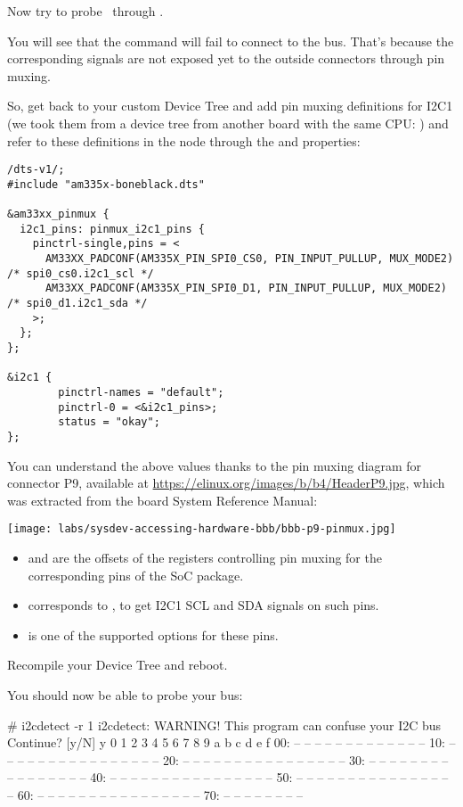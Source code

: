 {Now try to probe \busname\  through .

You will see that the command will fail to connect to
the bus. That's because the corresponding signals are
not exposed yet to the outside connectors through pin muxing.

So, get back to your custom Device Tree and add pin muxing definitions
for I2C1 (we took them from a device tree from another board with the same
CPU: ) and refer to these
definitions in the  node through the 
and  properties:

\begin{verbatim}
/dts-v1/;
#include "am335x-boneblack.dts"

&am33xx_pinmux {
  i2c1_pins: pinmux_i2c1_pins {
    pinctrl-single,pins = <
      AM33XX_PADCONF(AM335X_PIN_SPI0_CS0, PIN_INPUT_PULLUP, MUX_MODE2) /* spi0_cs0.i2c1_scl */
      AM33XX_PADCONF(AM335X_PIN_SPI0_D1, PIN_INPUT_PULLUP, MUX_MODE2) /* spi0_d1.i2c1_sda */
    >;
  };
};

&i2c1 {
        pinctrl-names = "default";
        pinctrl-0 = <&i2c1_pins>;
        status = "okay";
};
\end{verbatim}

You can understand the above values thanks to the pin muxing diagram for
connector P9, available at \url{https://elinux.org/images/b/b4/HeaderP9.jpg},
which was extracted from the board System Reference Manual:

\texttt{[image: labs/sysdev-accessing-hardware-bbb/bbb-p9-pinmux.jpg]}

\begin{itemize}
  \item {} and  are
        the offsets of the registers controlling pin muxing for the
	corresponding pins of the SoC package.
  \item {} corresponds to , to get I2C1 SCL and SDA
	signals on such pins.
  \item {} is one of the supported options for
        these pins.
\end{itemize}

Recompile your Device Tree and reboot.

You should now be able to probe your bus:

\begin{bashinput}
# i2cdetect -r 1
i2cdetect: WARNING! This program can confuse your I2C bus
Continue? [y/N] y
     0  1  2  3  4  5  6  7  8  9  a  b  c  d  e  f
00:          -- -- -- -- -- -- -- -- -- -- -- -- --
10: -- -- -- -- -- -- -- -- -- -- -- -- -- -- -- --
20: -- -- -- -- -- -- -- -- -- -- -- -- -- -- -- --
30: -- -- -- -- -- -- -- -- -- -- -- -- -- -- -- --
40: -- -- -- -- -- -- -- -- -- -- -- -- -- -- -- --
50: -- -- -- -- -- -- -- -- -- -- -- -- -- -- -- --
60: -- -- -- -- -- -- -- -- -- -- -- -- -- -- -- --
70: -- -- -- -- -- -- -- --
\end{bashinput}

}
